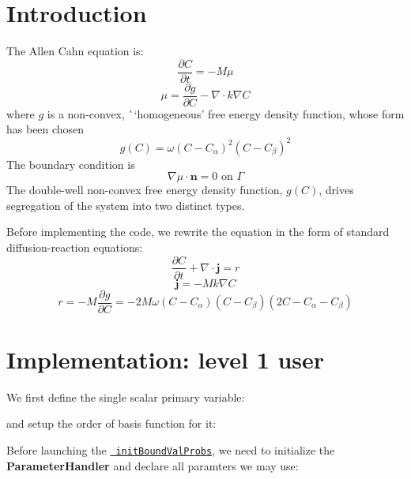 \hypertarget{growth_Introduction}{}\section{Introduction}\label{growth_Introduction}
The Allen Cahn equation is\+: \[ \frac{\partial C}{\partial t}=-M\mu \] \[ \mu=\frac{\partial g}{\partial C}-\nabla\cdot k\nabla C \] where $g$ is a non-\/convex, \`{}`homogeneous'\textquotesingle{} free energy density function, whose form has been chosen \[ g(C)=\omega(C-C_\alpha)^2(C-C_\beta)^2 \] The boundary condition is \[ \nabla \mu\cdot\boldsymbol{n}=0 \text{ on }\Gamma \] The double-\/well non-\/convex free energy density function, $g(C)$, drives segregation of the system into two distinct types.

Before implementing the code, we rewrite the equation in the form of standard diffusion-\/reaction equations\+: \[ \frac{\partial C}{\partial t}+\nabla\cdot\boldsymbol{j}=r \] \[ \boldsymbol{j}=-Mk\nabla C \] \[ r=-M\frac{\partial g}{\partial C}=-2M\omega(C-C_\alpha)(C-C_\beta)(2C-C_\alpha-C_\beta) \]\hypertarget{growth_imple}{}\section{Implementation\+: level 1 user}\label{growth_imple}
We first define the single scalar primary variable\+: 
\begin{DoxyCode}{0}
\end{DoxyCode}
 and setup the order of basis function for it\+: 
\begin{DoxyCode}{0}
\end{DoxyCode}
 Before launching the \href{../html/classinit_bound_val_probs.html}{\texttt{ init\+Bound\+Val\+Probs}}, we need to initialize the {\bfseries{Parameter\+Handler}} and declare all paramters we may use\+: 
\begin{DoxyCode}{0}
\DoxyCodeLine{\textcolor{comment}{//... more parameters }}
\end{DoxyCode}

